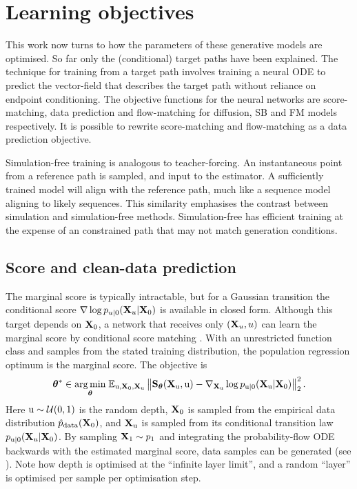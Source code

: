 \section{Learning objectives}
\label{sec:learning-objectives}

This work now turns to how the parameters of these generative models are optimised. So far only the (conditional) target paths have been explained. The technique for training from a target path involves training a neural \ac{ODE} to predict the vector-field that describes the target path without reliance on endpoint conditioning. The objective functions for the neural networks are score-matching, data prediction and flow-matching for diffusion, \ac{SB} and \ac{FM} models respectively. It is possible to rewrite score-matching and flow-matching as a data prediction objective.

Simulation-free training is analogous to teacher-forcing. An instantaneous point from a reference path is sampled, and input to the estimator. A sufficiently trained model will align with the reference path, much like a sequence model aligning to likely sequences. This similarity emphasises the contrast between simulation and simulation-free methods. Simulation-free has efficient training at the expense of an constrained path that may not match generation conditions.

\subsection{Score and clean-data prediction}

The marginal score is typically intractable, but for a Gaussian transition the conditional score $\nabla\log p_{u|0}({\mathbf{X}}_u|{\mathbf{X}}_0)$ is available in closed form. Although this target depends on ${\mathbf{X}}_0$, a network that receives only $({\mathbf{X}}_u,u)$ can learn the marginal score by conditional score matching \citep{song2021sde, vincent2011connection}. With an unrestricted function class and samples from the stated training distribution, the population regression optimum is the marginal score. The objective is
\[
\label{eq:score-objective}
{\bm{\theta}}^\ast\in\underset{{\bm{\theta}}}{\arg\min}\;\mathbb{E}_{{\textnormal{u}},{\mathbf{X}}_0,{\mathbf{X}}_{\textnormal{u}}}\left\lVert{\mathbf{S}}_{\bm{\theta}}({\mathbf{X}}_{\textnormal{u}},{\textnormal{u}})-\nabla_{{\mathbf{X}}_{\textnormal{u}}}\log p_{{\textnormal{u}}|0}({\mathbf{X}}_{\textnormal{u}}|{\mathbf{X}}_0)\right\rVert_2^2.
\]
Here ${\textnormal{u}}\sim{\mathcal{U}}(0,1)$ is the random depth, ${\mathbf{X}}_0$ is sampled from the empirical data distribution $\hat{p}_{\rm{data}}({\mathbf{X}}_0)$, and ${\mathbf{X}}_{\textnormal{u}}$ is sampled from its conditional transition law $p_{{\textnormal{u}}|0}({\mathbf{X}}_u|{\mathbf{X}}_0)$.
By sampling ${\mathbf{X}}_1\sim p_1$ and integrating the probability-flow \ac{ODE} backwards with the estimated marginal score, data samples can be generated (see ). Note how depth is optimised at the ``infinite layer limit'', and a random ``layer'' is optimised per sample per optimisation step.



